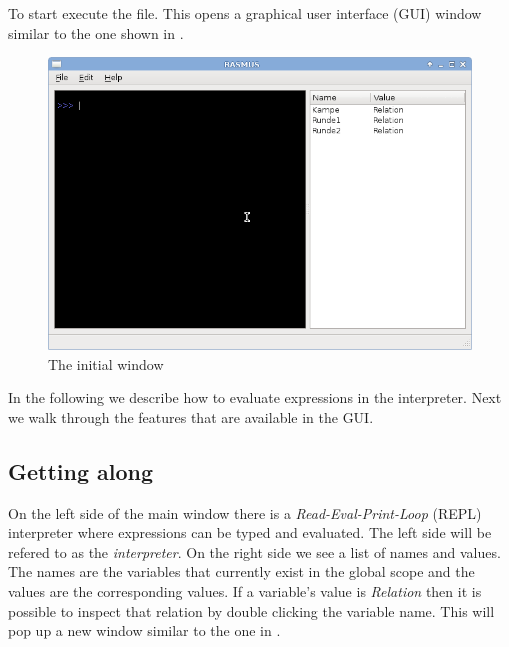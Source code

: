 \documentclass[a4,14pt,latin1]{article}
\begin{document}
To start \RAS{} execute the  file. This opens a graphical
user interface (GUI) window similar to the one shown in
.

\begin{figure}
  \centerline{\includegraphics[scale=0.5]{initial_window.png}}
  \caption{The initial \RAS{} window}
  \label{fig:initial_window}
\end{figure}

In the following we describe how to evaluate \RAS{} expressions in the
interpreter. Next we walk through the features that are available in
the GUI.

\subsection{Getting along}

On the left side of the main window there is a {\it
  Read-Eval-Print-Loop} (REPL) interpreter where \RAS{} expressions
can be typed and evaluated. The left side will be refered to as the
{\it interpreter}. On the right side we see a list of names and
values. The names are the variables that currently exist in the global
scope and the values are the corresponding values. If a variable's
value is {\it Relation} then it is possible to inspect that relation
by double clicking the variable name. This will pop up a new window
similar to the one in .
\end{document}

